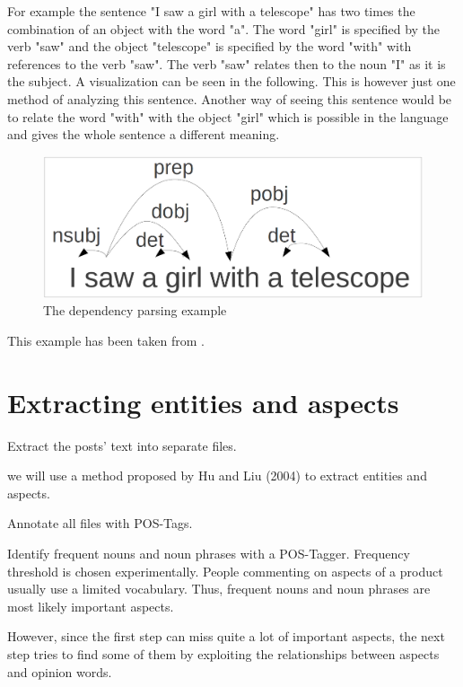\documentclass[10pt,a4paper]{article}
\begin{document}
		For example the sentence "I saw a girl with a telescope" has two times the combination of an object with the word "a". 
		The word "girl" is specified by the verb "saw" and the object "telescope" is specified by the word "with" with references to the verb "saw". 
		The verb "saw" relates then to the noun "I" as it is the subject. 		
		A visualization can be seen in the following.
		This is however just one method of analyzing this sentence.
		Another way of seeing this sentence would be to relate the word "with" with the object "girl" which is possible in the language and gives the whole sentence a different meaning.
		
		\begin{figure}[h]
			\includegraphics[width=\linewidth]{data/dependency}
			\caption{The dependency parsing example}
			\label{fig:dependency}
		\end{figure}
		
		This example has been taken from \cite{dependency}.
	
	\section{Extracting entities and aspects}
	
	Extract the posts' text into separate files.
	
	we will use a method proposed by Hu and Liu (2004) to extract entities and aspects.
	
	Annotate all files with POS-Tags.
	
	Identify frequent nouns and noun phrases with a POS-Tagger. Frequency threshold is chosen experimentally. People commenting on aspects of a product usually use a limited vocabulary. Thus, frequent nouns and noun phrases are most likely important aspects.
	
	However, since the first step can miss quite a lot of important aspects, the next step tries to find some of them by exploiting the relationships between aspects and opinion words.
	
\end{document}

